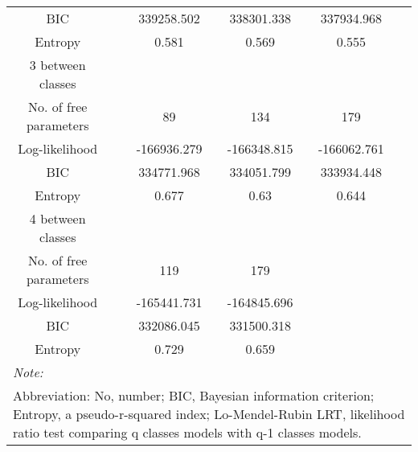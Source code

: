 \documentclass[11pt,a4paper]{article}
\begin{document}
\begin{table}
\begin{tabular}[t]{cccccc}
\hspace{1em}\hspace{1em}BIC &  & 339258.502 & 338301.338 & 337934.968 & \\
\hspace{1em}\hspace{1em}Entropy &  & 0.581 & 0.569 & 0.555 & \\
\hspace{1em}3 between classes &  &  &  &  & \\
\hspace{1em}\hspace{1em}No. of free parameters &  & 89 & 134 & 179 & \\
\hspace{1em}\hspace{1em}Log-likelihood &  & -166936.279 & -166348.815 & -166062.761 & \\
\hspace{1em}\hspace{1em}BIC &  & 334771.968 & 334051.799 & 333934.448 & \\
\hspace{1em}\hspace{1em}Entropy &  & 0.677 & 0.63 & 0.644 & \\
\hspace{1em}4 between classes &  &  &  &  & \\
\hspace{1em}\hspace{1em}No. of free parameters &  & 119 & 179 &  & \\
\hspace{1em}\hspace{1em}Log-likelihood &  & -165441.731 & -164845.696 &  & \\
\hspace{1em}\hspace{1em}BIC &  & 332086.045 & 331500.318 &  & \\
\hspace{1em}\hspace{1em}Entropy &  & 0.729 & 0.659 &  & \\
\bottomrule
\multicolumn{6}{l}{\textit{Note: }}\\
\multicolumn{6}{l}{Abbreviation: No, number; BIC, Bayesian information criterion; Entropy, a pseudo-r-squared index; Lo-Mendel-Rubin LRT, likelihood ratio test comparing q classes models with q-1 classes models.}\\
\end{tabular}
\end{table}
\end{document}
